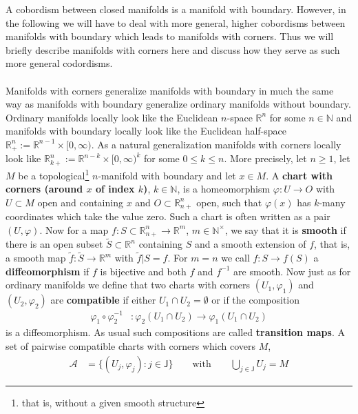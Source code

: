 A cobordism between closed manifolds is a manifold with boundary. However, in the following we will have to deal with more general, higher cobordisms between manifolds with boundary which leads to manifolds with corners. Thus we will briefly describe manifolds with corners here and discuss how they serve as such more general codordisms.
\\\\
Manifolds with corners generalize manifolds with boundary in much the same way as manifolds with boundary generalize ordinary manifolds without boundary. Ordinary manifolds locally look like the Euclidean $n$-space $\mathbb{R}^{n}$ for some $n \in \mathbb{N}$ and manifolds with boundary locally look like the Euclidean half-space $\mathbb{R}_{+}^{n} := \mathbb{R}^{n-1} \times [0,\infty)$. As a natural generalization manifolds with corners locally look like $\mathbb{R}_{k+}^{n} := \mathbb{R}^{n-k} \times [0,\infty)^{k}$ for some $0 \leq k \leq n$. More precisely, let $n \geq 1$, let $M$ be a topological\footnote{that is, without a given smooth structure} $n$-manifold with boundary and let $x \in M$. A \textbf{chart with corners (around $x$ of index $k$)}, $k \in \mathbb{N}$, is a homeomorphism $\varphi \colon U \to O$ with $U \subset M$ open and containing $x$ and $O \subset \mathbb{R}_{n+}^{n}$ open, such that $\varphi(x)$ has $k$-many coordinates which take the value zero. Such a chart is often written as a pair $(U,\varphi)$. Now for a map $f \colon S \subset \mathbb{R}_{n+}^{n} \to \mathbb{R}^{m}$, $m \in \mathbb{N}^{\times}$, we say that it is \textbf{smooth} if there is an open subset $\tilde{S} \subset \mathbb{R}^{n}$ containing $S$ and a smooth extension of $f$, that is, a smooth map $\tilde{f} \colon \tilde{S} \to \mathbb{R}^{m}$ with $\tilde{f}\vert S = f$. For $m=n$ we call $f \colon S \to f(S)$ a \textbf{diffeomorphism} if $f$ is bijective and both $f$ and $f^{-1}$ are smooth. Now just as for ordinary manifolds we define that two charts with corners $(U_{1},\varphi_{1})$ and $(U_{2},\varphi_{2})$ are \textbf{compatible} if either $U_{1} \cap U_{2} = \emptyset$ or if the composition
\begin{align*}
  \varphi_{1}
  \circ
  \varphi_{2}^{-1}
  &\colon
  \varphi_{2}(U_{1} \cap U_{2})
  \to
  \varphi_{1}(U_{1} \cap U_{2})
\end{align*}
is a diffeomorphism. As usual such compositions are called \textbf{transition maps}. A set of pairwise compatible charts with corners which covers $M$,
\begin{align*}
  \mathcal{A}
  &=
  \lbrace
    (U_{j},\varphi_{j})
    \colon
    j
    \in
    \mathsf{J}
  \rbrace
  \qquad
  \text{with}
  \qquad
  \bigcup_{j \in \mathsf{J}}
  U_{j}
  =
  M
\end{align*}
